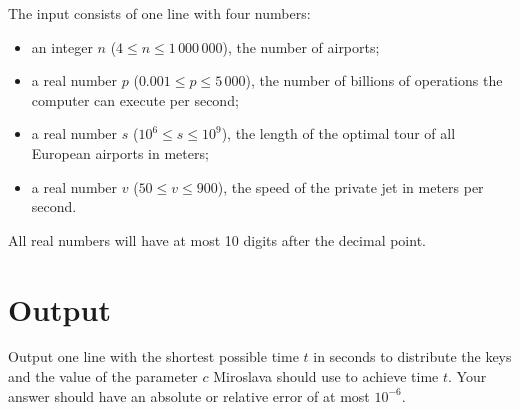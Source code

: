 The input consists of one line with four numbers:
\begin{itemize}
  \item an integer $n$ ($4 \le n \le 1\,000\,000$), the number of airports;
  \item a real number $p$ ($0.001 \le p \le 5\,000$), the number of billions of operations the computer can execute per second;
  \item a real number $s$ ($10^6 \le s \le 10^9$), the length of the optimal tour of all European airports in meters;
  \item a real number $v$ ($50 \le v \le 900$), the speed of the private jet in meters per second.
\end{itemize}

All real numbers will have at most 10 digits after the decimal point.

\section*{Output}

Output one line with the shortest possible time $t$ in seconds to distribute the keys and the value
of the parameter $c$ Miroslava should use to achieve time $t$. Your answer should have an absolute or
relative error of at most $10^{-6}$.
